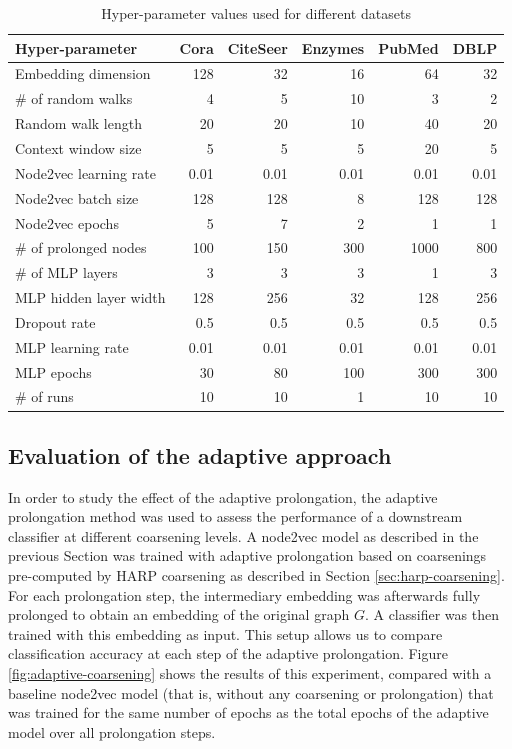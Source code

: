 \begin{table}
  \caption{Hyper-parameter values used for different datasets}
  \label{tab:hyperparameter-values}
  \begin{tabular}{lrrrrr}
    \toprule
    Hyper-parameter        & Cora & CiteSeer & Enzymes & PubMed & DBLP \\
    \midrule
    Embedding dimension    & 128  & 32       & 16      & 64     & 32   \\
    \# of random walks     & 4    & 5        & 10      & 3      & 2    \\
    Random walk length     & 20   & 20       & 10      & 40     & 20   \\
    Context window size    & 5    & 5        & 5       & 20     & 5    \\
    Node2vec learning rate & 0.01 & 0.01     & 0.01    & 0.01   & 0.01 \\
    Node2vec batch size    & 128  & 128      & 8       & 128    & 128  \\
    Node2vec epochs        & 5    & 7        & 2       & 1      & 1    \\
    \# of prolonged nodes  & 100  & 150      & 300     & 1000   & 800  \\
    \# of MLP layers       & 3    & 3        & 3       & 1      & 3    \\
    MLP hidden layer width & 128  & 256      & 32      & 128    & 256  \\
    Dropout rate           & 0.5  & 0.5      & 0.5     & 0.5    & 0.5  \\
    MLP learning rate      & 0.01 & 0.01     & 0.01    & 0.01   & 0.01 \\
    MLP epochs             & 30   & 80       & 100     & 300    & 300  \\
    \# of runs             & 10   & 10       & 1       & 10     & 10   \\
    \bottomrule
  \end{tabular}
\end{table}

\subsection{Evaluation of the adaptive approach}

In order to study the effect of the adaptive prolongation, the adaptive prolongation method was used to assess the performance of a downstream classifier at different coarsening levels. A node2vec model as described in the previous Section was trained with adaptive prolongation based on coarsenings pre-computed by HARP coarsening as described in Section \ref{sec:harp-coarsening}. For each prolongation step, the intermediary embedding was afterwards fully prolonged to obtain an embedding of the original graph \( G \). A classifier was then trained with this embedding as input. This setup allows us to compare classification accuracy at each step of the adaptive prolongation. Figure \ref{fig:adaptive-coarsening} shows the results of this experiment, compared with a baseline node2vec model (that is, without any coarsening or prolongation) that was trained for the same number of epochs as the total epochs of the adaptive model over all prolongation steps.

